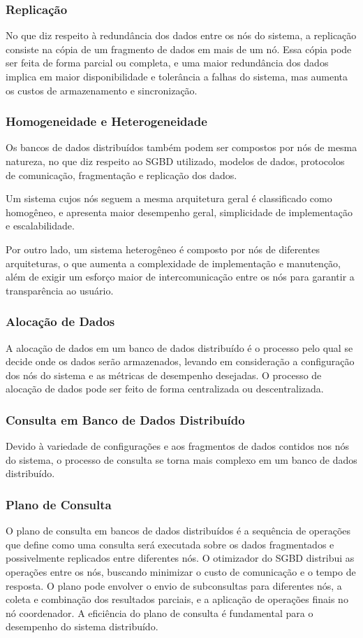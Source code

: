 \subsubsection{Replicação}
No que diz respeito à redundância dos dados entre os nós do sistema, a replicação consiste na cópia de um fragmento de dados em mais de um nó. Essa cópia pode ser feita de forma parcial ou completa, e uma maior redundância dos dados implica em maior disponibilidade e tolerância a falhas do sistema, mas aumenta os custos de armazenamento e sincronização.

\subsubsection{Homogeneidade e Heterogeneidade}
Os bancos de dados distribuídos também podem ser compostos por nós de mesma natureza, no que diz respeito ao SGBD utilizado, modelos de dados, protocolos de comunicação, fragmentação e replicação dos dados.

Um sistema cujos nós seguem a mesma arquitetura geral é classificado como homogêneo, e apresenta maior desempenho geral, simplicidade de implementação e escalabilidade.

Por outro lado, um sistema heterogêneo é composto por nós de diferentes arquiteturas, o que aumenta a complexidade de implementação e manutenção, além de exigir um esforço maior de intercomunicação entre os nós para garantir a transparência ao usuário.

\subsubsection{Alocação de Dados}
A alocação de dados em um banco de dados distribuído é o processo pelo qual se decide onde os dados serão armazenados, levando em consideração a configuração dos nós do sistema e as métricas de desempenho desejadas. O processo de alocação de dados pode ser feito de forma centralizada ou descentralizada.

\subsubsection{Consulta em Banco de Dados Distribuído}
Devido à variedade de configurações e aos fragmentos de dados contidos nos nós do sistema, o processo de consulta se torna mais complexo em um banco de dados distribuído.

\subsubsection{Plano de Consulta}
O plano de consulta em bancos de dados distribuídos é a sequência de operações que define como uma consulta será executada sobre os dados fragmentados e possivelmente replicados entre diferentes nós. O otimizador do SGBD distribui as operações entre os nós, buscando minimizar o custo de comunicação e o tempo de resposta. O plano pode envolver o envio de subconsultas para diferentes nós, a coleta e combinação dos resultados parciais, e a aplicação de operações finais no nó coordenador. A eficiência do plano de consulta é fundamental para o desempenho do sistema distribuído.

